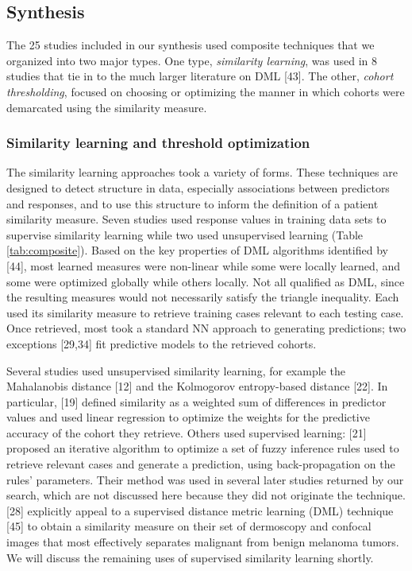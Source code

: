 \documentclass[preprint, 3p,
authoryear]{elsarticle} %
\begin{document}
\hypertarget{synthesis-1}{%
\subsection{Synthesis}\label{synthesis-1}}

The 25 studies included in our synthesis used composite techniques that
we organized into two major types. One type, \emph{similarity learning},
was used in 8 studies that tie in to the much larger literature on DML
{[}43{]}. The other, \emph{cohort thresholding}, focused on choosing or
optimizing the manner in which cohorts were demarcated using the
similarity measure.

\hypertarget{similarity-learning-and-threshold-optimization}{%
\subsubsection{Similarity learning and threshold
optimization}\label{similarity-learning-and-threshold-optimization}}

The similarity learning approaches took a variety of forms. These
techniques are designed to detect structure in data, especially
associations between predictors and responses, and to use this structure
to inform the definition of a patient similarity measure. Seven studies
used response values in training data sets to supervise similarity
learning while two used unsupervised learning (Table
\ref{tab:composite}). Based on the key properties of DML algorithms
identified by {[}44{]}, most learned measures were non-linear while some
were locally learned, and some were optimized globally while others
locally. Not all qualified as DML, since the resulting measures would
not necessarily satisfy the triangle inequality. Each used its
similarity measure to retrieve training cases relevant to each testing
case. Once retrieved, most took a standard NN approach to generating
predictions; two exceptions {[}29,34{]} fit predictive models to the
retrieved cohorts.

Several studies used unsupervised similarity learning, for example the
Mahalanobis distance {[}12{]} and the Kolmogorov entropy-based distance
{[}22{]}. In particular, {[}19{]} defined similarity as a weighted sum
of differences in predictor values and used linear regression to
optimize the weights for the predictive accuracy of the cohort they
retrieve. Others used supervised learning: {[}21{]} proposed an
iterative algorithm to optimize a set of fuzzy inference rules used to
retrieve relevant cases and generate a prediction, using
back-propagation on the rules' parameters. Their method was used in
several later studies returned by our search, which are not discussed
here because they did not originate the technique. {[}28{]} explicitly
appeal to a supervised distance metric learning (DML) technique {[}45{]}
to obtain a similarity measure on their set of dermoscopy and confocal
images that most effectively separates malignant from benign melanoma
tumors. We will discuss the remaining uses of supervised similarity
learning shortly.
\end{document}
